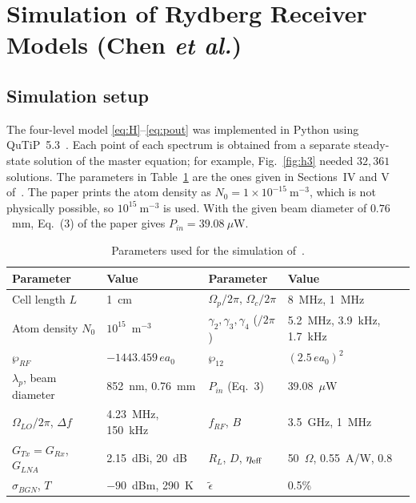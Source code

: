 \documentclass[11pt,a4paper]{article}
\begin{document}

\section{Simulation of Rydberg Receiver Models (Chen \textit{et al.})}
\label{sec:impl1}

\subsection{Simulation setup}

The four-level model \eqref{eq:H}--\eqref{eq:pout} was implemented in Python using
QuTiP~5.3~\cite{johansson2012qutip}. Each point of each spectrum is obtained from a separate
steady-state solution of the master equation; for example, Fig.~\ref{fig:h3} needed $32{,}361$
solutions. The parameters in Table~\ref{tab:hparams} are the ones given in Sections~IV and V
of~\cite{chen2025harnessing}. The paper prints the atom density as
$N_0=1\times10^{-15}~\text{m}^{-3}$, which is not physically possible, so
$10^{15}~\text{m}^{-3}$ is used. With the given beam diameter of $0.76$~mm, Eq.~(3) of the paper
gives $P_{in}=39.08~\mu$W.

\begin{table}[H]
\centering
\caption{Parameters used for the simulation of~\cite{chen2025harnessing}.}
\label{tab:hparams}
\small
\renewcommand{\arraystretch}{1.15}
\begin{tabular}{llll}
\toprule
\textbf{Parameter} & \textbf{Value} & \textbf{Parameter} & \textbf{Value}\\
\midrule
Cell length $L$ & 1~cm & $\Omega_p/2\pi$, $\Omega_c/2\pi$ & 8~MHz, 1~MHz\\
Atom density $N_0$ & $10^{15}$~m$^{-3}$ & $\gamma_2,\gamma_3,\gamma_4$ ($/2\pi$) & 5.2~MHz, 3.9~kHz, 1.7~kHz\\
$\wp_{RF}$ & $-1443.459\,ea_0$ & $\wp_{12}$ & $(2.5\,ea_0)^2$\\
$\lambda_p$, beam diameter & 852~nm, 0.76~mm & $P_{in}$ (Eq.~3) & 39.08~$\mu$W\\
$\Omega_{LO}/2\pi$, $\Delta f$ & 4.23~MHz, 150~kHz & $f_{RF}$, $B$ & 3.5~GHz, 1~MHz\\
$G_{Tx}=G_{Rx}$, $G_{LNA}$ & 2.15~dBi, 20~dB & $R_L$, $D$, $\eta_{\rm eff}$ & 50~$\Omega$, 0.55~A/W, 0.8\\
$\sigma_{BGN}$, $T$ & $-90$~dBm, 290~K & $\tilde\epsilon$ & 0.5\%\\
\bottomrule
\end{tabular}
\end{table}
\end{document}
